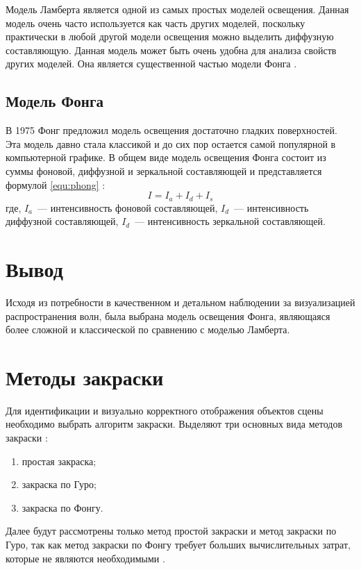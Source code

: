 Модель Ламберта является одной из самых простых моделей освещения.
Данная модель очень часто используется как часть других моделей, поскольку практически в любой другой модели освещения можно выделить диффузную составляющую.
Данная модель может быть очень удобна для анализа свойств других моделей.
Она является существенной частью модели Фонга \cite{baseLight}.

\subsection{Модель Фонга}

В 1975 Фонг предложил модель освещения достаточно гладких поверхностей.
Эта модель давно стала классикой и до сих пор остается самой популярной в компьютерной графике.
В общем виде модель освещения Фонга состоит из суммы фоновой, диффузной и зеркальной составляющей и представляется формулой \ref{equ:phong} \cite{baseLight}:
\begin{equation}
	\label{equ:phong}
	I = I_{a} + I_{d} + I_{s}
\end{equation}
где, $I_{a}$~--- интенсивность фоновой составляющей,
\newline $I_{d}$~--- интенсивность диффузной составляющей,
\newline $I_{d}$~--- интенсивность зеркальной составляющей.

\section*{Вывод}

Исходя из потребности в качественном и детальном наблюдении за визуализацией распространения волн, была выбрана модель освещения Фонга, являющаяся более сложной и классической по сравнению с моделью Ламберта.

\section{Методы закраски}

Для идентификации и визуально корректного отображения объектов сцены необходимо выбрать алгоритм закраски.
Выделяют три основных вида методов закраски \cite{draw1}:
\begin{enumerate}
	\item простая закраска;
	\item закраска по Гуро;
	\item закраска по Фонгу.
\end{enumerate}
Далее будут рассмотрены только метод простой закраски и метод закраски по Гуро, так как метод закраски по Фонгу требует больших вычислительных затрат, которые не являются необходимыми \cite{base}.

